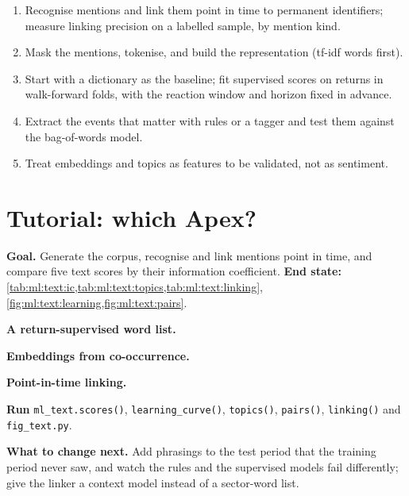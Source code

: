 \begin{method}\label{met:ml:text:method}
\begin{enumerate}
\item Recognise mentions and link them point in time to permanent identifiers; measure linking precision on a labelled
sample, by mention kind.
\item Mask the mentions, tokenise, and build the representation (tf-idf words first).
\item Start with a dictionary as the baseline; fit supervised scores on returns in walk-forward folds, with the reaction
window and horizon fixed in advance.
\item Extract the events that matter with rules or a tagger and test them against the bag-of-words model.
\item Treat embeddings and topics as features to be validated, not as sentiment.
\end{enumerate}
\end{method}

\section{Tutorial: which Apex?}\label{tut:ml:text-from-bag-of-words-to-embeddings:tut}

\begin{tutorial}
\textbf{Goal.} Generate the corpus, recognise and link mentions point in time, and compare five text scores by their
information coefficient. \textbf{End state:} \cref{tab:ml:text:ic,tab:ml:text:topics,tab:ml:text:linking},
\cref{fig:ml:text:learning,fig:ml:text:pairs}.
\begin{tutsteps}
\item \textbf{A return-supervised word list.}
\label{lst:ml:text:supervised}
\item \textbf{Embeddings from co-occurrence.}
\label{lst:ml:text:ppmi}
\item \textbf{Point-in-time linking.}
\label{lst:ml:text:link}
\item \textbf{Run} \texttt{ml\_text.scores()}, \texttt{learning\_curve()}, \texttt{topics()}, \texttt{pairs()},
\texttt{linking()} and \texttt{fig\_text.py}.
\end{tutsteps}
\textbf{What to change next.} Add phrasings to the test period that the training period never saw, and watch the rules and
the supervised models fail differently; give the linker a context model instead of a sector-word list.
\end{tutorial}

